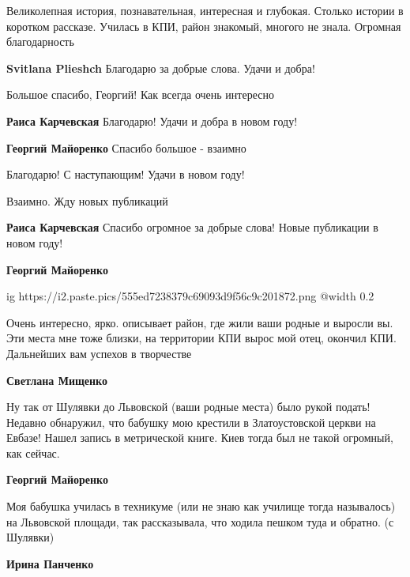 \begin{itemize}
Великолепная история, познавательная, интересная и глубокая. Столько истории в
коротком рассказе. Училась в КПИ, район знакомый, многого не знала. Огромная
благодарность


\textbf{Svitlana Plieshch} Благодарю за добрые слова. Удачи и добра!

Большое спасибо, Георгий!
Как всегда очень интересно

\begin{itemize} %
\textbf{Раиса Карчевская} Благодарю! Удачи и добра в новом году!

\textbf{Георгий Майоренко} Спасибо большое - взаимно
\end{itemize} %

Благодарю! С наступающим! Удачи в новом году!

Взаимно. Жду новых публикаций

\begin{itemize} %
\textbf{Раиса Карчевская} Спасибо огромное за добрые слова! Новые публикации в новом году!

\textbf{Георгий Майоренко}

\ifcmt
  ig https://i2.paste.pics/555ed7238379c69093d9f56c9c201872.png
  @width 0.2
\fi

\end{itemize} %

Очень интересно, ярко. описывает район, где жили ваши родные и выросли вы.
Эти места мне тоже близки, на территории КПИ вырос мой отец, окончил КПИ.
Дальнейших вам успехов в творчестве

\begin{itemize} %
\textbf{Светлана Мищенко} 

Ну так от Шулявки до Львовской (ваши родные места) было рукой подать! Недавно
обнаружил, что бабушку мою крестили в Златоустовской церкви на Евбазе! Нашел
запись в метрической книге. Киев тогда был не такой огромный, как сейчас.

\textbf{Георгий Майоренко} 

Моя бабушка училась в техникуме (или не знаю как училище тогда называлось) на
Львовской площади, так рассказывала, что ходила пешком туда и обратно. (с Шулявки)

\textbf{Ирина Панченко} 


\end{itemize}
\end{itemize}
